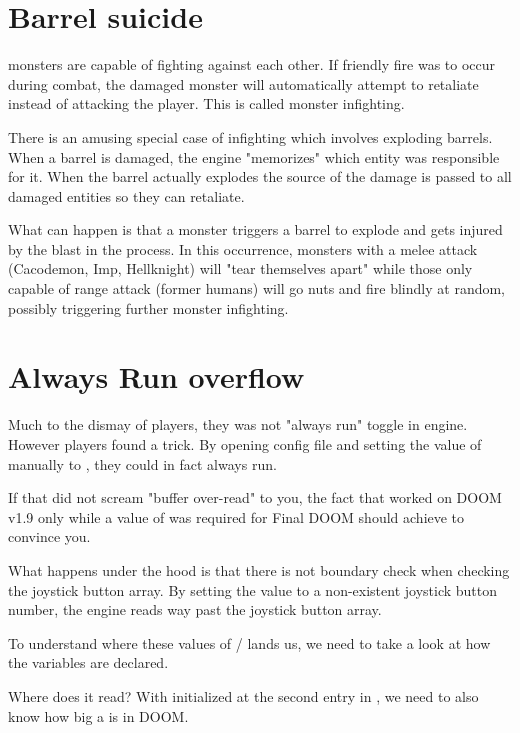 \section{Barrel suicide}
\doom{} monsters are capable of fighting against each other. If friendly fire was to occur during combat, the damaged monster will automatically attempt to retaliate instead of attacking the player. This is called monster infighting.\\
\par
There is an amusing special case of infighting which involves exploding barrels. When a barrel is damaged, the engine "memorizes" which entity was responsible for it. When the barrel actually explodes the source of the damage is passed to all damaged entities so they can retaliate.\\
\par
What can happen is that a monster triggers a barrel to explode and gets injured by the blast in the process. In this occurrence, monsters with a melee attack (Cacodemon, Imp, Hellknight) will "tear themselves apart" while those only capable of range attack (former humans) will go nuts and fire blindly at random, possibly triggering further monster infighting.









\section{Always Run overflow}
Much to the dismay of players, they was not "always run" toggle in \doom{} engine. However players found a trick. By opening \doom{} config file and setting the value of  manually to , they could in fact always run.\\
\par
If that did not scream "buffer over-read" to you, the fact that  worked on DOOM v1.9 only while a value of  was required for Final DOOM should achieve to convince you.\\
\par 
What happens under the hood is that there is not boundary check when checking the joystick button array. By setting the value to a non-existent joystick button number, the engine reads way past the joystick button array.\\
\par
{}
\par
To understand where these values of / lands us, we need to take a look at how the variables are declared.\\
\par
{}
\par
Where does it read? With  initialized at the second entry in , we need to also know how big a  is in DOOM.\\
\par

